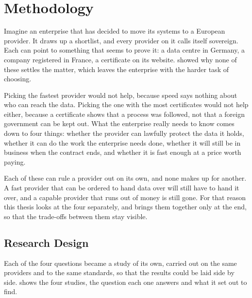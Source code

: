 \chapter{Methodology}
\label{ch:methodology}

Imagine an enterprise that has decided to move its systems to a European provider.
It draws up a shortlist, and every provider on it calls itself sovereign. Each can
point to something that seems to prove it: a data centre in Germany, a company
registered in France, a certificate on its website.  showed
why none of these settles the matter, which leaves the enterprise with the harder
task of choosing.

Picking the fastest provider would not help, because speed says nothing about who
can reach the data. Picking the one with the most certificates would not help
either, because a certificate shows that a process was followed, not that a foreign
government can be kept out. What the enterprise really needs to know comes down to
four things: whether the provider can lawfully protect the data it holds, whether
it can do the work the enterprise needs done, whether it will still be in business
when the contract ends, and whether it is fast enough at a price worth paying.

Each of these can rule a provider out on its own, and none makes up for another. A
fast provider that can be ordered to hand data over will still have to hand it
over, and a capable provider that runs out of money is still gone. For that reason
this thesis looks at the four separately, and brings them together only at the end,
so that the trade-offs between them stay visible.

\section{Research Design}
\label{sec:research-design}

Each of the four questions became a study of its own, carried out on the same
providers and to the same standards, so that the results could be laid side by
side.  shows the four studies, the question each one
answers and what it set out to find.

